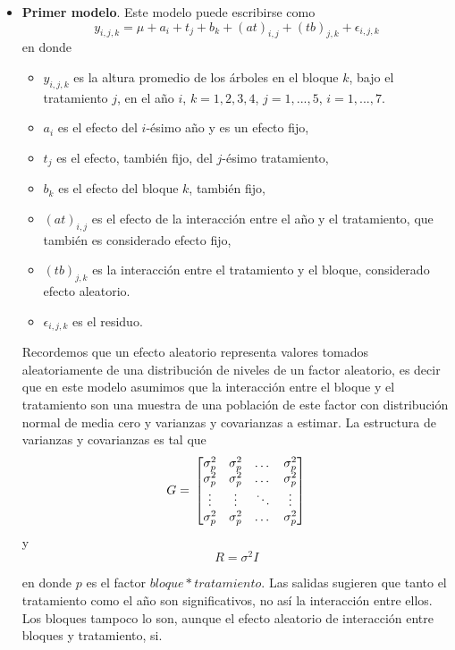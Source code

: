 \documentclass[a4paper,10pt]{article}
\begin{document}
\begin{itemize}
 \item \textbf{Primer modelo}. Este modelo puede escribirse como
    \begin{equation}
      y_{i,j,k} = \mu + a_i + t_j + b_k + (at)_{i,j} + (tb)_{j,k} + \epsilon_{i,j,k}
    \end{equation}
  en donde
  \begin{itemize}
   \item $y_{i,j,k}$ es la altura promedio de los árboles en el bloque $k$, bajo el tratamiento $j$, en el año $i$, $k = 1, 2, 3, 4$, $j = 1, ..., 5$, 
   $i = 1, ..., 7$.
   \item $a_i$ es el efecto del $i$-ésimo año y es un efecto fijo,
   \item $t_j$ es el efecto, también fijo, del $j$-ésimo tratamiento,
   \item $b_k$ es el efecto del bloque $k$, también fijo,
   \item $(at)_{i,j}$ es el efecto de la interacción entre el año y el tratamiento, que también es considerado efecto fijo,
   \item $(tb)_{j,k}$ es la interacción entre el tratamiento y el bloque, considerado efecto aleatorio.
   \item $\epsilon_{i,j,k}$ es el residuo.
  \end{itemize}
  
  Recordemos que un efecto aleatorio representa valores tomados aleatoriamente de una distribución de niveles de un factor aleatorio, es decir que 
  en este modelo asumimos que la interacción entre el bloque y el tratamiento son una muestra de una población de este factor con distribución normal
  de media cero y varianzas y covarianzas a estimar. La estructura de varianzas y covarianzas es tal que 
  \[
  G = \\
  \begin{bmatrix}
      \sigma^2_p & \sigma^2_p &  \dots  & \sigma^2_p \\
      \sigma^2_p & \sigma^2_p &  \dots  & \sigma^2_p \\
      \vdots & \vdots &  \ddots & \vdots \\
      \sigma^2_p & \sigma^2_p &  \dots  & \sigma^2_p
  \end{bmatrix}
  \]
  y 
  \begin{equation*}
   R = \sigma^2 I
  \end{equation*}

  en donde $p$ es el factor $bloque * tratamiento$.
  Las salidas sugieren que tanto el tratamiento como el año son significativos, no así la interacción entre ellos. Los bloques tampoco lo son, aunque el 
  efecto aleatorio de interacción entre bloques y tratamiento, si. 
  

\end{itemize}
\end{document}
